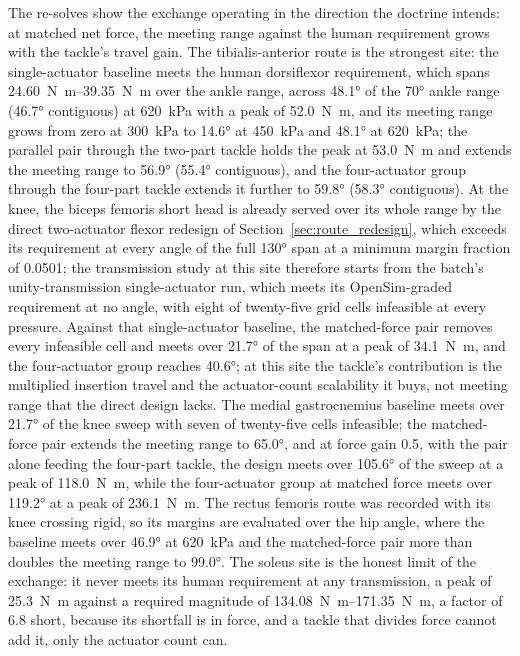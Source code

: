\documentclass[utf8]{FrontiersinHarvard} %
\begin{document}
The re-solves show the exchange operating in the direction the doctrine intends: at matched net force, the meeting range against the human requirement grows with the tackle's travel gain. The tibialis-anterior route is the strongest site: the single-actuator baseline meets the human dorsiflexor requirement, which spans \qtyrange{24.60}{39.35}{\newton\meter} over the ankle range, across \ang{48.1} of the \ang{70} ankle range (\ang{46.7} contiguous) at \qty{620}{\kPa} with a peak of \qty{52.0}{\newton\meter}, and its meeting range grows from zero at \qty{300}{\kPa} to \ang{14.6} at \qty{450}{\kPa} and \ang{48.1} at \qty{620}{\kPa}; the parallel pair through the two-part tackle holds the peak at \qty{53.0}{\newton\meter} and extends the meeting range to \ang{56.9} (\ang{55.4} contiguous), and the four-actuator group through the four-part tackle extends it further to \ang{59.8} (\ang{58.3} contiguous). At the knee, the biceps femoris short head is already served over its whole range by the direct two-actuator flexor redesign of Section~\ref{sec:route_redesign}, which exceeds its requirement at every angle of the full \ang{130} span at a minimum margin fraction of 0.0501; the transmission study at this site therefore starts from the batch's unity-transmission single-actuator run, which meets its OpenSim-graded requirement at no angle, with eight of twenty-five grid cells infeasible at every pressure. Against that single-actuator baseline, the matched-force pair removes every infeasible cell and meets over \ang{21.7} of the span at a peak of \qty{34.1}{\newton\meter}, and the four-actuator group reaches \ang{40.6}; at this site the tackle's contribution is the multiplied insertion travel and the actuator-count scalability it buys, not meeting range that the direct design lacks. The medial gastrocnemius baseline meets over \ang{21.7} of the knee sweep with seven of twenty-five cells infeasible; the matched-force pair extends the meeting range to \ang{65.0}, and at force gain 0.5, with the pair alone feeding the four-part tackle, the design meets over \ang{105.6} of the sweep at a peak of \qty{118.0}{\newton\meter}, while the four-actuator group at matched force meets over \ang{119.2} at a peak of \qty{236.1}{\newton\meter}. The rectus femoris route was recorded with its knee crossing rigid, so its margins are evaluated over the hip angle, where the baseline meets over \ang{46.9} at \qty{620}{\kPa} and the matched-force pair more than doubles the meeting range to \ang{99.0}. The soleus site is the honest limit of the exchange: it never meets its human requirement at any transmission, a peak of \qty{25.3}{\newton\meter} against a required magnitude of \qtyrange{134.08}{171.35}{\newton\meter}, a factor of 6.8 short, because its shortfall is in force, and a tackle that divides force cannot add it, only the actuator count can.
\end{document}
